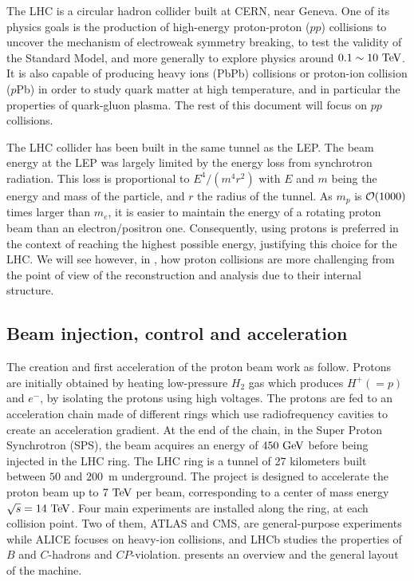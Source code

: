     The LHC \cite{LHC} is a circular hadron collider built at CERN, near Geneva. One of its physics
    goals is the production of high-energy proton-proton ($pp$) collisions to uncover the mechanism
    of electroweak symmetry breaking, to test the validity of the Standard Model, and more
    generally to explore physics around $0.1 \sim 10~\text{TeV}$.
    It is also capable of producing heavy ions (PbPb) collisions or proton-ion
    collision ($p$Pb) in order to study quark matter at high temperature,
    and in particular the properties of quark-gluon plasma. The rest of this document will
    focus on $pp$ collisions.

    The LHC collider has been built in the same tunnel as the LEP. The beam energy at
    the LEP was largely limited by the energy loss from synchrotron radiation. This loss
    is proportional to $E^4 / (m^{4} r^{2})$ with $E$ and $m$ being the energy and mass of the
    particle, and $r$ the radius of the tunnel. As $m_p$ is $\mathcal{O}(1000)$ times larger than $m_e$, it is
    easier to maintain the energy of a rotating proton beam than an electron/positron one.
    Consequently, using protons is preferred in the context of reaching the highest possible
    energy, justifying this choice for the LHC. We will see however, in
    , how proton collisions are more challenging
    from the point of view of the reconstruction and analysis due to their internal structure.

    \subsection{Beam injection, control and acceleration}

    The creation and first acceleration of the proton beam work as follow. Protons are initially
    obtained by heating low-pressure $H_2$ gas which produces $H^+ (= p)$ and $e^-$, by isolating
    the protons using high voltages. The protons are fed to an acceleration
    chain made of different rings which use radiofrequency cavities to create an acceleration
    gradient. At the end of the chain, in the Super Proton Synchrotron (SPS), the
    beam acquires an energy of $450~\text{GeV}$ before being injected in the LHC ring. The LHC
    ring is a tunnel of 27 kilometers built between $50$ and $200$~m underground. The
    project is designed to accelerate the proton beam up to $7~\text{TeV}$ per beam,
    corresponding to a center of mass energy $\sqrt{s} = 14~\text{TeV}$. Four main experiments are
    installed along the ring, at each collision point. Two of them, ATLAS and CMS, are
    general-purpose experiments while ALICE focuses on heavy-ion collisions, and LHCb studies
    the properties of $B$ and $C$-hadrons and $CP$-violation.  presents an
    overview and the general layout of the machine.


